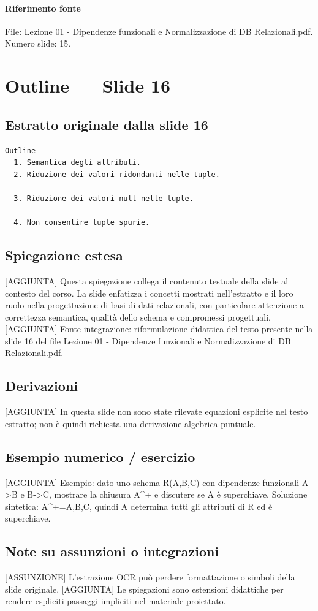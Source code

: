 \documentclass[11pt]{article}
\begin{document}
\paragraph{Riferimento fonte} File: Lezione 01 - Dipendenze funzionali e Normalizzazione di DB Relazionali.pdf. Numero slide: 15.
\section{Outline --- Slide 16}
\subsection*{Estratto originale dalla slide 16}
\begin{lstlisting}
Outline
  1. Semantica degli attributi.
  2. Riduzione dei valori ridondanti nelle tuple.

  3. Riduzione dei valori null nelle tuple.

  4. Non consentire tuple spurie.
\end{lstlisting}
\subsection*{Spiegazione estesa}
[AGGIUNTA] Questa spiegazione collega il contenuto testuale della slide al contesto del corso. La slide enfatizza i concetti mostrati nell'estratto e il loro ruolo nella progettazione di basi di dati relazionali, con particolare attenzione a correttezza semantica, qualità dello schema e compromessi progettuali.
[AGGIUNTA] Fonte integrazione: riformulazione didattica del testo presente nella slide 16 del file Lezione 01 - Dipendenze funzionali e Normalizzazione di DB Relazionali.pdf.
\subsection*{Derivazioni}
[AGGIUNTA] In questa slide non sono state rilevate equazioni esplicite nel testo estratto; non è quindi richiesta una derivazione algebrica puntuale.
\subsection*{Esempio numerico / esercizio}
[AGGIUNTA] Esempio: dato uno schema R(A,B,C) con dipendenze funzionali A->B e B->C, mostrare la chiusura A^+ e discutere se A è superchiave. Soluzione sintetica: A^+={A,B,C}, quindi A determina tutti gli attributi di R ed è superchiave.
\subsection*{Note su assunzioni o integrazioni}
[ASSUNZIONE] L'estrazione OCR può perdere formattazione o simboli della slide originale.
[AGGIUNTA] Le spiegazioni sono estensioni didattiche per rendere espliciti passaggi impliciti nel materiale proiettato.
\end{document}
